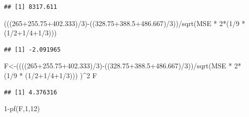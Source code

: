 \documentclass[
]{book}
\newenvironment{Shaded}{\begin{snugshade}}{\end{snugshade}}
\newcommand{\DecValTok}[1]{\textcolor[rgb]{0.00,0.00,0.81}{#1}}
\newcommand{\FloatTok}[1]{\textcolor[rgb]{0.00,0.00,0.81}{#1}}
\newcommand{\FunctionTok}[1]{\textcolor[rgb]{0.00,0.00,0.00}{#1}}
\newcommand{\NormalTok}[1]{#1}
\newcommand{\OtherTok}[1]{\textcolor[rgb]{0.56,0.35,0.01}{#1}}
\newcommand{\SpecialCharTok}[1]{\textcolor[rgb]{0.00,0.00,0.00}{#1}}
\begin{document}
\begin{verbatim}
## [1] 8317.611
\end{verbatim}

\begin{Shaded}
\begin{Highlighting}[]
\NormalTok{(((}\DecValTok{265}\FloatTok{+255.75+402.333}\NormalTok{)}\SpecialCharTok{/}\DecValTok{3}\NormalTok{)}\SpecialCharTok{{-}}\NormalTok{((}\FloatTok{328.75+388.5+486.667}\NormalTok{)}\SpecialCharTok{/}\DecValTok{3}\NormalTok{))}\SpecialCharTok{/}\FunctionTok{sqrt}\NormalTok{(MSE }\SpecialCharTok{*} \DecValTok{2}\SpecialCharTok{*}\NormalTok{(}\DecValTok{1}\SpecialCharTok{/}\DecValTok{9} \SpecialCharTok{*}\NormalTok{ (}\DecValTok{1}\SpecialCharTok{/}\DecValTok{2}\SpecialCharTok{+}\DecValTok{1}\SpecialCharTok{/}\DecValTok{4}\SpecialCharTok{+}\DecValTok{1}\SpecialCharTok{/}\DecValTok{3}\NormalTok{)))}
\end{Highlighting}
\end{Shaded}

\begin{verbatim}
## [1] -2.091965
\end{verbatim}

\begin{Shaded}
\begin{Highlighting}[]
\NormalTok{F}\OtherTok{\textless{}{-}}\NormalTok{((((}\DecValTok{265}\FloatTok{+255.75+402.333}\NormalTok{)}\SpecialCharTok{/}\DecValTok{3}\NormalTok{)}\SpecialCharTok{{-}}\NormalTok{((}\FloatTok{328.75+388.5+486.667}\NormalTok{)}\SpecialCharTok{/}\DecValTok{3}\NormalTok{))}\SpecialCharTok{/}\FunctionTok{sqrt}\NormalTok{(MSE }\SpecialCharTok{*} \DecValTok{2}\SpecialCharTok{*}\NormalTok{(}\DecValTok{1}\SpecialCharTok{/}\DecValTok{9} \SpecialCharTok{*}\NormalTok{ (}\DecValTok{1}\SpecialCharTok{/}\DecValTok{2}\SpecialCharTok{+}\DecValTok{1}\SpecialCharTok{/}\DecValTok{4}\SpecialCharTok{+}\DecValTok{1}\SpecialCharTok{/}\DecValTok{3}\NormalTok{)))}
\NormalTok{)}\SpecialCharTok{\^{}}\DecValTok{2}
\NormalTok{F}
\end{Highlighting}
\end{Shaded}

\begin{verbatim}
## [1] 4.376316
\end{verbatim}

\begin{Shaded}
\begin{Highlighting}[]
\DecValTok{1}\SpecialCharTok{{-}}\FunctionTok{pf}\NormalTok{(F,}\DecValTok{1}\NormalTok{,}\DecValTok{12}\NormalTok{)}
\end{Highlighting}
\end{Shaded}
\end{document}
